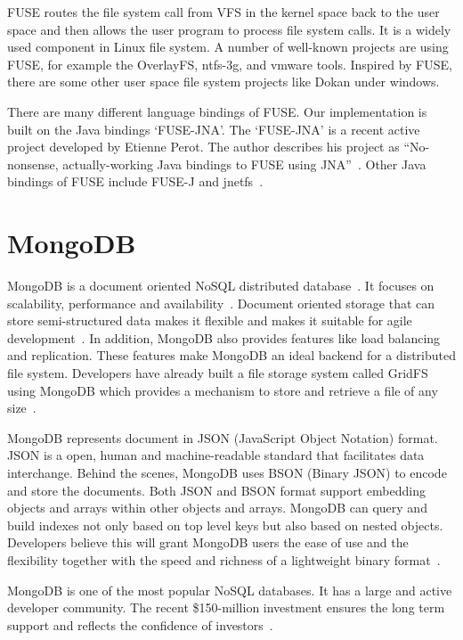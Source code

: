     FUSE routes the file system call from VFS in the kernel space back to the user space and then allows the user program to process file system calls. It is a widely used component in Linux file system. A number of well-known projects are using FUSE, for example the OverlayFS, ntfs-3g, and vmware tools. Inspired by FUSE, there are some other user space file system projects like Dokan under windows.

    There are many different language bindings of FUSE. Our implementation is built on the Java bindings `FUSE-JNA'. The `FUSE-JNA' is a recent active project developed by Etienne Perot. The author describes his project as ``No-nonsense, actually-working Java bindings to FUSE using JNA''~\cite{fusejna}. Other Java bindings of FUSE include FUSE-J and jnetfs~\cite{jnetfs}.

\section{MongoDB}

    MongoDB is a document oriented NoSQL distributed database~\cite{mongo_overview}. It focuses on scalability, performance and availability~\cite{mongo_overview}. Document oriented storage that can store semi-structured data makes it flexible and makes it suitable for agile development~\cite{docdb}. In addition, MongoDB also provides features like load balancing and replication. These features make MongoDB an ideal backend for a distributed file system. Developers have already built a file storage system called GridFS using MongoDB which provides a mechanism to store and retrieve a file of any size~\cite{gridfs}.

    MongoDB represents document in JSON (JavaScript Object Notation) format. JSON is a open, human and machine-readable standard that facilitates data interchange. Behind the scenes, MongoDB uses BSON (Binary JSON) to encode and store the documents. Both JSON and BSON format support embedding objects and arrays within other objects and arrays. MongoDB can query and build indexes not only based on top level keys but also based on nested objects. Developers believe this will grant MongoDB users the ease of use and the flexibility together with the speed and richness of a lightweight binary format~\cite{bson}.

    MongoDB is one of the most popular NoSQL databases. It has a large and active developer community. The recent \$150-million investment ensures the long term support and reflects the confidence of investors~\cite{mongInvest}.

